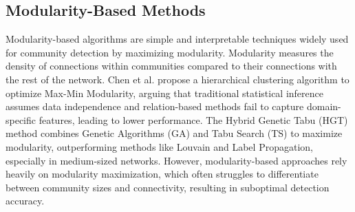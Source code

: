 \documentclass{article}
\begin{document}
\subsection{Modularity-Based Methods}
Modularity-based algorithms are simple and interpretable techniques widely used for community detection by maximizing modularity. Modularity measures the density of connections within communities compared to their connections with the rest of the network. Chen et al.\cite{doi:10.1137/1.9781611972795.84} propose a hierarchical clustering algorithm to optimize Max-Min Modularity, arguing that traditional statistical inference assumes data independence and relation-based methods fail to capture domain-specific features, leading to lower performance. The Hybrid Genetic Tabu (HGT)\cite{doi:10.1080/24751839.2021.1987076} method combines Genetic Algorithms (GA) and Tabu Search (TS) to maximize modularity, outperforming methods like Louvain and Label Propagation, especially in medium-sized networks. However, modularity-based approaches rely heavily on modularity maximization, which often struggles to differentiate between community sizes and connectivity, resulting in suboptimal detection accuracy.
\end{document}
